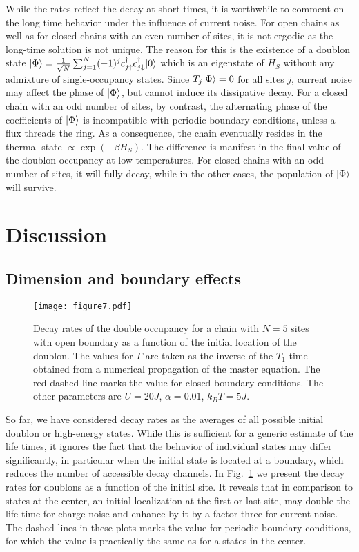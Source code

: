 \documentclass[twocolumn,prb,showpacs]{revtex4-1}
\DeclarePairedDelimiter\ket{\lvert}{\rangle}
\begin{document}
While the rates reflect the decay at short times, it is worthwhile to
comment on the long time behavior under the influence of current
noise.  For open chains as well as for closed chains with an even
number of sites, it is not ergodic as the long-time solution is not unique.
The reason for this is the existence of a doublon state
${\ket{\Phi}=\frac{1}{\sqrt{N}}\sum_{j=1}^N (-1)^j
c^\dagger_{j\uparrow}c^\dagger_{j\downarrow}\ket{0}}$ which is an
eigenstate of $H_S$ without any admixture of single-occupancy states.
Since $T_j\ket{\Phi}=0$ for all sites $j$, current noise may affect
the phase of ${\ket{\Phi}}$, but cannot induce its dissipative decay.
For a closed chain with an odd number of sites, by contrast, the alternating
phase of the coefficients of $\ket{\Phi}$ is incompatible with periodic
boundary conditions, unless a flux threads the ring.  As a consequence,
the chain eventually resides in the thermal state $\propto\exp(-\beta
H_S)$.  The difference is manifest in the final value of the doublon
occupancy at low temperatures.  For closed chains with an odd number of
sites, it will fully decay, while in the other cases, the population of
$\ket{\Phi}$ will survive.

\section{Discussion}
\label{sec:discussion}
\subsection{Dimension and boundary effects}
\label{sec:boundary}

\begin{figure}[tb]
    \centering\texttt{[image: figure7.pdf]}
    \caption{Decay rates of the double occupancy for a chain with $N=5$ sites 
        with open boundary as a function of the initial location of the doublon.
	The values for $\Gamma$ are taken as the inverse of the $T_1$ time
	obtained from a numerical propagation of the master equation.
        The red dashed line marks the value for closed boundary conditions.
	The other parameters are $U=20J$, $\alpha=0.01$, $k_B T=5J$.}
    \label{fig:site_dependence}
\end{figure}

So far, we have considered decay rates as the averages of all possible
initial doublon or high-energy states.  While this is sufficient for a
generic estimate of the life times, it ignores the fact that the behavior
of individual states may differ significantly, in particular when the
initial state is located at a boundary, which reduces the number of
accessible decay channels.  In Fig.~\ref{fig:site_dependence} we present
the decay rates for doublons as a function of the initial site.  It reveals
that in comparison to states at the center, an initial localization at the
first or last site, may double the life time for charge noise and enhance by
it by a factor three for current noise.  The dashed lines in these plots
marks the value for periodic boundary conditions, for which the value is
practically the same as for a states in the center.
\end{document}
